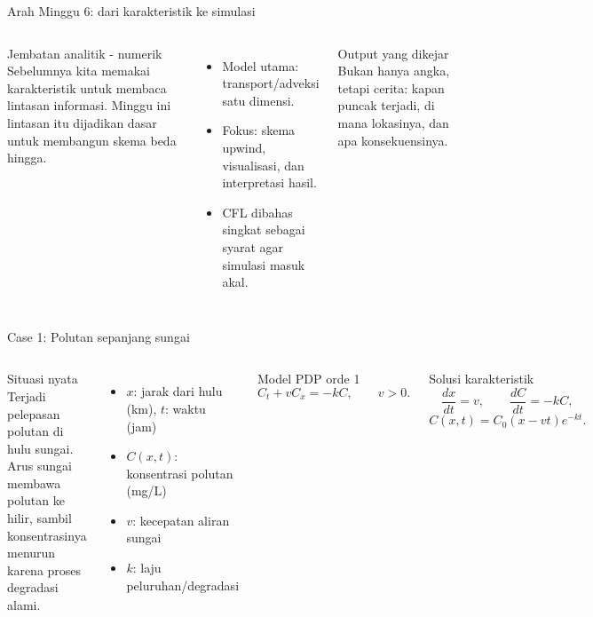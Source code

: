 \documentclass[aspectratio=169,10pt]{beamer}
\begin{document}
\begin{frame}{Arah Minggu 6: dari karakteristik ke simulasi}
\begin{columns}[T]
\begin{block}{Jembatan analitik - numerik}
Sebelumnya kita memakai karakteristik untuk membaca lintasan informasi. Minggu ini lintasan itu dijadikan dasar untuk membangun skema beda hingga.
\end{block}
\vspace{0.4em}
\begin{itemize}
  \item Model utama: transport/adveksi satu dimensi.
  \item Fokus: skema upwind, visualisasi, dan interpretasi hasil.
  \item CFL dibahas singkat sebagai syarat agar simulasi masuk akal.
\end{itemize}
\centering
\vspace{0.3cm}
\hspace{0.35cm}\par\vspace{0.55cm}
\hspace{0.35cm}\par\vspace{0.7cm}
\begin{block}{Output yang dikejar}
Bukan hanya angka, tetapi cerita: kapan puncak terjadi, di mana lokasinya, dan apa konsekuensinya.
\end{block}
\end{columns}
\end{frame}

\begin{frame}{Case 1: Polutan sepanjang sungai}
\begin{columns}[T]
\begin{block}{Situasi nyata}
Terjadi pelepasan polutan di hulu sungai. Arus sungai membawa polutan ke hilir, sambil konsentrasinya menurun karena proses degradasi alami.
\end{block}
\vspace{0.2em}
\begin{itemize}
  \item $x$: jarak dari hulu (km), $t$: waktu (jam)
  \item $C(x,t)$: konsentrasi polutan (mg/L)
  \item $v$: kecepatan aliran sungai
  \item $k$: laju peluruhan/degradasi
\end{itemize}
\begin{block}{Model PDP orde 1}
\[
  C_t + v C_x = -k C,\qquad v>0.
\]
\end{block}
\begin{block}{Solusi karakteristik}
\[
  \frac{dx}{dt}=v,\qquad \frac{dC}{dt}=-kC,
\]
\[
  C(x,t)=C_0(x-vt)e^{-kt}.
\]
\end{block}
\end{columns}
\end{frame}
\end{document}
